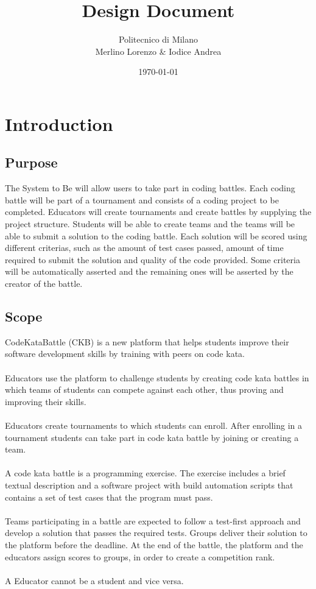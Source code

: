 \documentclass{article}
\title{Design Document}
\author{
	Politecnico di Milano\\
	Merlino Lorenzo \& Iodice Andrea
}
\date{\today}
\begin{document}
\maketitle
\tableofcontents
\newpage
\section{Introduction}
\subsection{Purpose}
The System to Be will allow users to take part in coding battles. Each coding battle will be part of a tournament and consists of a coding project to be completed.
Educators will create tournaments and create battles by supplying the project structure. 
Students will be able to create teams and the teams will be able to submit a solution to the coding battle. Each solution will be scored using different criterias, such as the amount of test cases passed, amount of time required to submit the solution and quality of the code provided.
Some criteria will be automatically asserted and the remaining ones will be asserted by the creator of the battle.
\subsection{Scope}
CodeKataBattle (CKB) is a new platform that helps students improve their software development skills by training with peers on code kata. 
\\\\
Educators use the platform to challenge students by creating code kata battles in which teams of students can compete against each other, thus proving and improving their skills. 
\\\\
Educators create tournaments to which students can enroll. After enrolling in a tournament students can take part in code kata battle by joining or creating a team.
\\\\
A code kata battle is a programming exercise.
The exercise includes a brief textual description and a software project with build automation scripts that contains a set of test cases that the program must pass.
\\\\
Teams participating in a battle are expected to follow a test-first approach and develop a solution that passes the required tests. Groups deliver their solution to the platform before the deadline.
At the end of the battle, the platform and the educators assign scores to groups, in order to create a competition rank.
\\\\
A Educator cannot be a student and vice versa.
\end{document}
